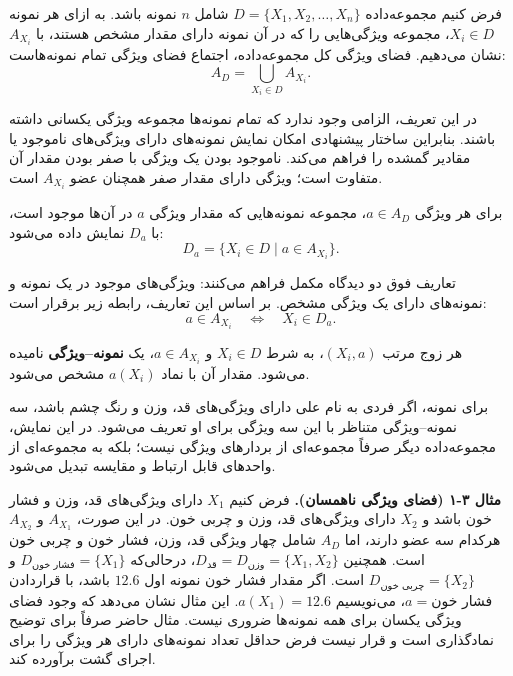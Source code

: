 \begin{definition}
فرض کنیم مجموعه‌داده $D=\{X_1,X_2,\ldots,X_n\}$ شامل $n$ نمونه باشد. به ازای هر نمونه $X_i\in D$، مجموعه ویژگی‌هایی را که در آن نمونه دارای مقدار مشخص هستند، با $A_{X_i}$ نشان می‌دهیم. فضای ویژگی کل مجموعه‌داده، اجتماع فضای ویژگی تمام نمونه‌هاست:
\begin{equation}\label{eq:ch3-feature-space}
A_D=\bigcup_{X_i\in D}A_{X_i}.
\end{equation}
\end{definition}
در این تعریف، الزامی وجود ندارد که تمام نمونه‌ها مجموعه ویژگی یکسانی داشته باشند. بنابراین ساختار پیشنهادی امکان نمایش نمونه‌های دارای ویژگی‌های ناموجود یا مقادیر گمشده را فراهم می‌کند. ناموجود بودن یک ویژگی با صفر بودن مقدار آن متفاوت است؛ ویژگی دارای مقدار صفر همچنان عضو $A_{X_i}$ است.

\begin{definition}
برای هر ویژگی $a\in A_D$، مجموعه نمونه‌هایی که مقدار ویژگی $a$ در آن‌ها موجود است، با $D_a$ نمایش داده می‌شود:
\begin{equation}\label{eq:ch3-feature-samples}
D_a=\bigl\{X_i\in D\mid a\in A_{X_i}\bigr\}.
\end{equation}
\end{definition}
تعاریف فوق دو دیدگاه مکمل فراهم می‌کنند: ویژگی‌های موجود در یک نمونه و نمونه‌های دارای یک ویژگی مشخص. بر اساس این تعاریف، رابطه زیر برقرار است:
\begin{equation}\label{eq:ch3-incidence}
a\in A_{X_i}\quad\Longleftrightarrow\quad X_i\in D_a.
\end{equation}

\begin{definition}
هر زوج مرتب $(X_i,a)$، به شرط $X_i\in D$ و $a\in A_{X_i}$، یک \textbf{نمونه--ویژگی} نامیده می‌شود. مقدار آن با نماد $a(X_i)$ مشخص می‌شود.
\end{definition}
برای نمونه، اگر فردی به نام علی دارای ویژگی‌های قد، وزن و رنگ چشم باشد، سه نمونه--ویژگی متناظر با این سه ویژگی برای او تعریف می‌شود. در این نمایش، مجموعه‌داده دیگر صرفاً مجموعه‌ای از بردارهای ویژگی نیست؛ بلکه به مجموعه‌ای از واحدهای قابل ارتباط و مقایسه تبدیل می‌شود.

\noindent\textbf{مثال ۳-۱ (فضای ویژگی ناهمسان).}
فرض کنیم $X_1$ دارای ویژگی‌های قد، وزن و فشار خون باشد و $X_2$ دارای ویژگی‌های قد، وزن و چربی خون. در این صورت، $A_{X_1}$ و $A_{X_2}$ هرکدام سه عضو دارند، اما $A_D$ شامل چهار ویژگی قد، وزن، فشار خون و چربی خون است. همچنین $D_{\text{قد}}=D_{\text{وزن}}=\{X_1,X_2\}$، درحالی‌که $D_{\text{فشار خون}}=\{X_1\}$ و $D_{\text{چربی خون}}=\{X_2\}$ است. اگر مقدار فشار خون نمونه اول $12.6$ باشد، با قراردادن $a=\text{فشار خون}$، می‌نویسیم $a(X_1)=12.6$. این مثال نشان می‌دهد که وجود فضای ویژگی یکسان برای همه نمونه‌ها ضروری نیست. مثال حاضر صرفاً برای توضیح نمادگذاری است و قرار نیست فرض حداقل تعداد نمونه‌های دارای هر ویژگی را برای اجرای گشت برآورده کند.

